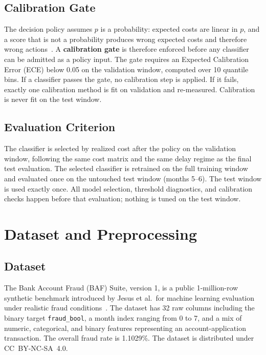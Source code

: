 \documentclass[conference]{IEEEtran}
\begin{document}
\subsection{Calibration Gate}

The decision policy assumes $p$ is a probability: expected costs are linear
in $p$, and a score that is not a probability produces wrong expected costs
and therefore wrong actions~\cite{dalpozzolo2015}. A \textbf{calibration
gate} is therefore enforced before any classifier can be admitted as a
policy input. The gate requires an Expected Calibration Error (ECE) below
0.05 on the validation window, computed over 10 quantile bins. If a
classifier passes the gate, no calibration step is applied. If it fails,
exactly one calibration method is fit on validation and re-measured.
Calibration is never fit on the test window.

\subsection{Evaluation Criterion}

The classifier is selected by realized cost after the policy on the
validation window, following the same cost matrix and the same delay regime
as the final test evaluation. The selected classifier is retrained on the
full training window and evaluated once on the untouched test window
(months 5--6). The test window is used exactly once. All model selection,
threshold diagnostics, and calibration checks happen before that
evaluation; nothing is tuned on the test window.

\section{Dataset and Preprocessing}

\subsection{Dataset}

The Bank Account Fraud (BAF) Suite, version 1, is a public 1-million-row
synthetic benchmark introduced by Jesus et al.\ for machine learning
evaluation under realistic fraud conditions~\cite{jesus2022}. The dataset
has 32 raw columns including the binary target \texttt{fraud\_bool}, a
month index ranging from 0 to 7, and a mix of numeric, categorical, and
binary features representing an account-application transaction. The
overall fraud rate is 1.1029\%. The dataset is distributed under
CC~BY-NC-SA~4.0.
\end{document}
